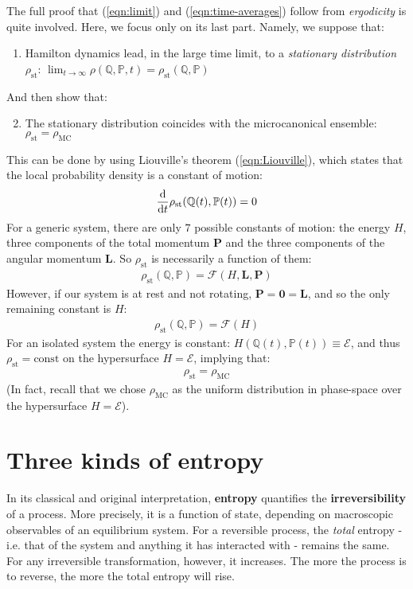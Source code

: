 \documentclass[../../main.tex]{subfiles}
\begin{document}
The full proof that (\ref{eqn:limit}) and (\ref{eqn:time-averages}) follow from \textit{ergodicity} is quite involved. Here, we focus only on its last part. Namely, we suppose that:
\begin{enumerate}
    \item Hamilton dynamics lead, in the large time limit, to a \textit{stationary distribution} $\rho_{\mathrm{st}}$: 
    $\displaystyle \lim_{t \to \infty} \rho(\mathbb{Q}, \mathbb{P}, t) = \rho_{\mathrm{st}}(\mathbb{Q}, \mathbb{P})$
\end{enumerate}
And then show that:
\begin{enumerate}
    \setcounter{enumi}{1}
    \item The stationary distribution coincides with the microcanonical ensemble: $\rho_{\mathrm{st}} = \rho_{\mathrm{MC}}$
\end{enumerate}
This can be done by using Liouville's theorem (\ref{eqn:Liouville}), which states that the local probability density is a constant of motion:
\begin{align*}
    \dv{t} \rho_{\mathrm{st}}(\mathbb{Q}(t), \mathbb{P}(t)) = 0
\end{align*}
For a generic system, there are only $7$ possible constants of motion: the energy $H$, three components of the total momentum $\bm{P}$ and the three components of the angular momentum $\bm{L}$. So $\rho_{\mathrm{st}}$ is necessarily a function of them:
\begin{align*}
    \rho_{\mathrm{st}}(\mathbb{Q}, \mathbb{P}) = \mathcal{F}(H, \bm{L}, \bm{P})
\end{align*}
However, if our system is at rest and not rotating, $\bm{P} = \bm{0} = \bm{L}$, and so the only remaining constant is $H$:
\begin{align*}
    \rho_{\mathrm{st}}(\mathbb{Q}, \mathbb{P}) = \mathcal{F}(H)
\end{align*}
For an isolated system the energy is constant: $H(\mathbb{Q}(t), \mathbb{P}(t)) \equiv \mathcal{E}$, and thus $\rho_{\mathrm{st}} = \text{const}$ on the hypersurface $H=\mathcal{E}$, implying that:
\begin{align*}
    \rho_{\mathrm{st}} = \rho_{\mathrm{MC}}
\end{align*}
(In fact, recall that we chose $\rho_{\mathrm{MC}}$ as the uniform distribution in phase-space over the hypersurface $H=\mathcal{E}$).

\section{Three kinds of entropy}
In its classical and original interpretation, \textbf{entropy} quantifies the \textbf{irreversibility} of a process. More precisely, it is a function of state, depending on macroscopic observables of an equilibrium system. For a reversible process, the \textit{total} entropy - i.e. that of the system and anything it has interacted with - remains the same. For any irreversible transformation, however, it increases. The more the process is  to reverse, the more the total entropy will rise.
\end{document}
